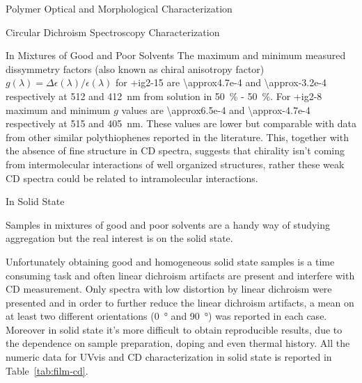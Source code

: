 \begin{section}{Polymer Optical and Morphological Characterization}
\begin{subsection}{Circular Dichroism Spectroscopy Characterization}
\begin{subsubsection}{In Mixtures of Good and Poor Solvents}
The maximum and minimum measured dissymmetry factors (also known as chiral anisotropy factor) $g(\lambda) = \Delta\epsilon(\lambda) / \epsilon(\lambda)$ for \cmpd+{ig2-15} are \SI{\approx4.7e-4}{} and \SI{\approx-3.2e-4}{} respectively at 512 and \SI{412}{\nm} from solution in  50~\% -  50~\%. For \cmpd+{ig2-8} maximum and minimum $g$ values are \SI{\approx6.5e-4}{} and \SI{\approx-4.7e-4}{} respectively at 515 and \SI{405}{\nm}. 
These values are lower but comparable with data from other similar poly\-thio\-phenes reported in the literature. This, together with the absence of fine structure in \gls{CD} spectra, suggests that chirality isn't coming from intermolecular interactions of well organized structures, rather these weak \gls{CD} spectra could be related to intramolecular interactions. 
\end{subsubsection}
\begin{subsubsection}{In Solid State}

Samples in mixtures of good and poor solvents are a handy way of studying aggregation but the real interest is on the solid state. 

Unfortunately obtaining good and homogeneous solid state samples is a time consuming task and often linear dichroism artifacts are present and interfere with \gls{CD} measurement. 
Only spectra with low distortion by linear dichroism were presented and in order to further reduce the linear dichroism artifacts, a mean on at least two different orientations (\SI{0}{\degree} and \SI{90}{\degree}) was reported in each case. Moreover in solid state it's more difficult to obtain reproducible results, due to the dependence on sample preparation, doping and even thermal history.
All the numeric data for \gls{UVvis} and \gls{CD} characterization in solid state is reported in Table~\ref{tab:film-cd}. 


\end{subsubsection}
\end{subsection}
\end{section}
